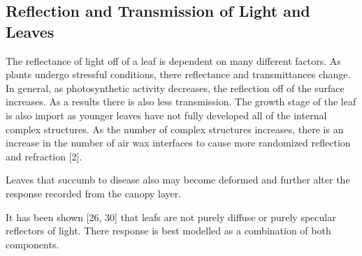 \subsection{Reflection and Transmission of Light and Leaves}

The reflectance of light off of a leaf is dependent on many different factors.  As plants undergo stressful conditions, there reflectance and transmittances change.  In general, as photosynthetic activity decreases, the reflection off of the surface increases.  As a results there is also less transmission.  The growth stage of the leaf is also import as younger leaves have not fully developed all of the internal complex structures.  As the number of complex structures increases, there is an increase in the number of air wax interfaces to cause more randomized reflection and refraction [2].

Leaves that succumb to disease also may become deformed and further alter the response recorded from the canopy layer.

It has been shown [26, 30] that leafs are not purely diffuse or purely specular reflectors of light.  There response is best modelled as a combination of both components.
